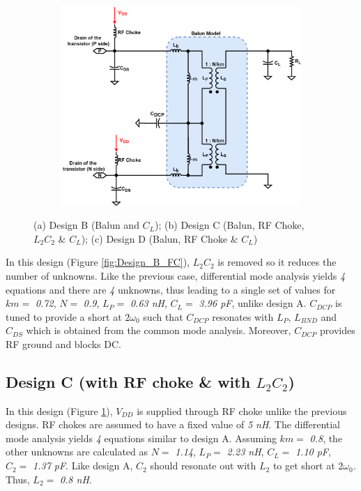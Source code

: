 \documentclass[conference]{IEEEtran}
\begin{document}
\begin{figure}[!t]
\begin{subfigure}{0.24\textwidth}
\caption{}
\label{fig:Design_C_FC}
\end{subfigure}
\begin{subfigure}{0.24\textwidth}
\includegraphics[width=1\textwidth]{Images/Design/Design_D_FC.png}
\caption{}
\label{fig:Design_D_FC}
\end{subfigure}
\caption{(a) Design B (Balun and $C_L$); (b) Design C (Balun, RF Choke, $L_2C_2$ \& $C_L$); (c) Design D (Balun, RF Choke \& $C_L$)}
\label{fig:Design_B_C_D}
\end{figure}

In this design (Figure \ref{fig:Design_B_FC}), $L_2C_2$ is removed so it reduces the number of unknowns. Like the previous case, differential mode analysis yields \textit{4} equations and there are \textit{4} unknowns, thus leading to a single set of values for $km =$ \textit{0.72}, $N =$ \textit{0.9}, $L_P =$ \textit{0.63 nH}, $C_L =$ \textit{3.96 pF}, unlike design A. $C_{DCP}$ is tuned to provide a short at $2\omega_0$ such that $C_{DCP}$ resonates with $L_P$, $L_{BND}$ and $C_{DS}$ which is obtained from the common mode analysis. Moreover, $C_{DCP}$ provides RF ground and blocks DC.

\subsection{Design C (with RF choke \& with $L_2C_2$)}
In this design (Figure \ref{fig:Design_C_FC}), $V_{DD}$ is supplied through RF choke unlike the previous designs. RF chokes are assumed to have a fixed value of \textit{5 nH}. The differential mode analysis yields \textit{4} equations similar to design A. Assuming $km =$ \textit{0.8}, the other unknowns are calculated as $N =$ \textit{1.14}, $L_P =$ \textit{2.23 nH}, $C_L =$ \textit{1.10 pF}, $C_2 =$ \textit{1.37 pF}.
Like design A, $C_2$ should resonate out with $L_2$ to get short at $2\omega_0$. Thus, $L_2 =$ \textit{0.8 nH}. 
\end{document}
